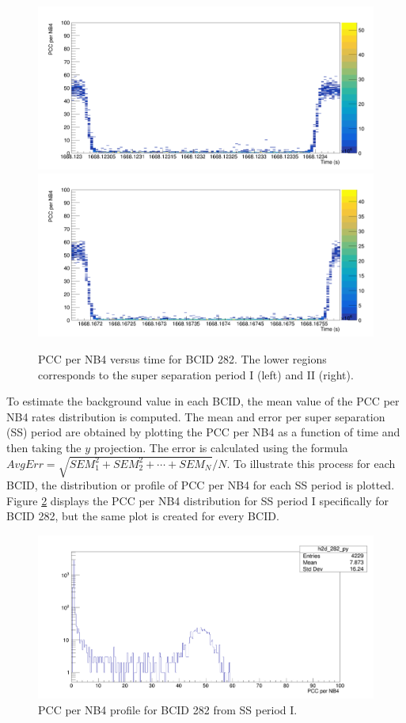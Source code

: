 \begin{center}
\begin{figure}[h!]
\centering
\includegraphics[width=.49\textwidth]{Chapter4/BX_282_Rates_SS1.png}
\includegraphics[width=.49\textwidth]{Chapter4/BX_282_Rates_SS2.png}
\caption[Super Separation periods for BCID 282]{PCC per NB4 versus time for BCID 282. The lower regions corresponds to the super separation period I (left) and II (right).}
\label{ssp_wide_bx282}
\end{figure}
\end{center}

To estimate the background value in each BCID, the mean value of the PCC per NB4 rates distribution is computed. The mean and error per super separation (SS) period are obtained by plotting the PCC per NB4 as a function of time and then taking the $y$ projection. The error is calculated using the formula $AvgErr = \sqrt{SEM_1^2 + SEM_2^2 + \cdots + SEM_N}/N$. To illustrate this process for each BCID, the distribution or profile of PCC per NB4 for each SS period is plotted. Figure \ref{ss1_hist_282} displays the PCC per NB4 distribution for SS period I specifically for BCID 282, but the same plot is created for every BCID.\\

\begin{center}
  \begin{figure}[h!]
    \centering
    \includegraphics[scale=.18]{Chapter4/ss1_histo_bx282.png}
    \caption[PCC per NB4 profile for BCID 282 from SS period I]{ PCC per NB4 profile for BCID 282 from SS period I.} 
    \label{ss1_hist_282}
  \end{figure}
\end{center}


